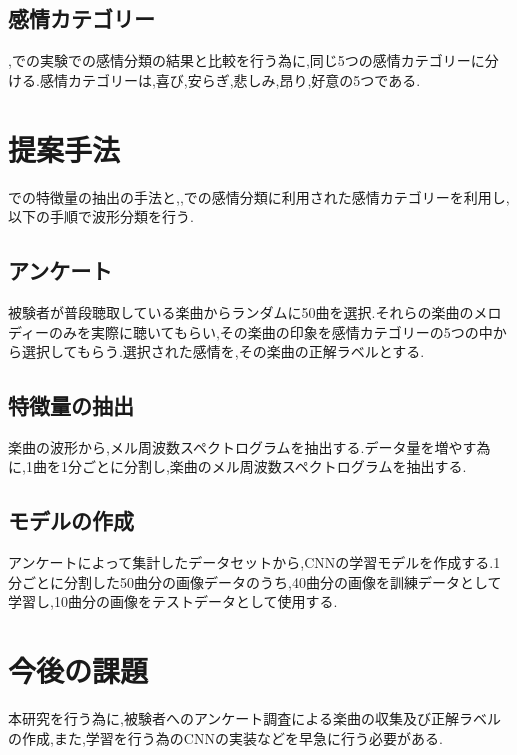 \documentclass[twocolumn,twoside,9.5pt]{jarticle}
\begin{document}
\subsection{感情カテゴリー}
\cite{gushiken1},\cite{gushiken2}での実験での感情分類の結果と比較を行う為に,同じ5つの感情カテゴリーに分ける.感情カテゴリーは,喜び,安らぎ,悲しみ,昂り,好意の5つである.

\section{提案手法}
\cite{deep}での特徴量の抽出の手法と,\cite{gushiken1},\cite{gushiken2}での感情分類に利用された感情カテゴリーを利用し,以下の手順で波形分類を行う.

\subsection{アンケート}
被験者が普段聴取している楽曲からランダムに50曲を選択.それらの楽曲のメロディーのみを実際に聴いてもらい,その楽曲の印象を感情カテゴリーの5つの中から選択してもらう.選択された感情を,その楽曲の正解ラベルとする.\\

\subsection{特徴量の抽出}
楽曲の波形から,メル周波数スペクトログラムを抽出する.データ量を増やす為に,1曲を1分ごとに分割し,楽曲のメル周波数スペクトログラムを抽出する.\\

\subsection{モデルの作成}
アンケートによって集計したデータセットから,CNNの学習モデルを作成する.1分ごとに分割した50曲分の画像データのうち,40曲分の画像を訓練データとして学習し,10曲分の画像をテストデータとして使用する.\\


\section{今後の課題}
本研究を行う為に,被験者へのアンケート調査による楽曲の収集及び正解ラベルの作成,また,学習を行う為のCNNの実装などを早急に行う必要がある.\\
\end{document}
